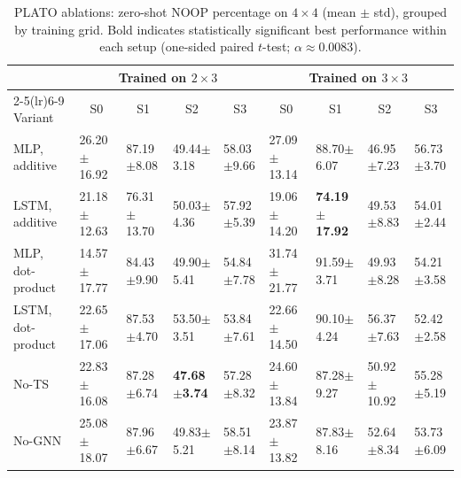 \begin{table}[h]
\centering
\small
\setlength{\tabcolsep}{1.4pt}
\renewcommand{\arraystretch}{1.02}
\begin{tabular}{@{\hspace{2pt}}l|l|l|l|l||l|l|l|l@{\hspace{2pt}}}
\toprule
& \multicolumn{4}{c||}{Trained on $2\times 3$} & \multicolumn{4}{c}{Trained on $3\times 3$} \\
\cmidrule(lr){2-5}\cmidrule(lr){6-9}
Variant & \multicolumn{1}{c|}{S0} & \multicolumn{1}{c|}{S1} & \multicolumn{1}{c|}{S2} & \multicolumn{1}{c||}{S3}
        & \multicolumn{1}{c|}{S0} & \multicolumn{1}{c|}{S1} & \multicolumn{1}{c|}{S2} & \multicolumn{1}{c}{S3} \\
\midrule
MLP, additive      & 26.20$\pm$16.92 & 87.19$\pm$8.08 & 49.44$\pm$3.18 & 58.03$\pm$9.66
                  & 27.09$\pm$13.14 & 88.70$\pm$6.07 & 46.95$\pm$7.23 & 56.73$\pm$3.70 \\
LSTM, additive     & 21.18$\pm$12.63 & 76.31$\pm$13.70 & 50.03$\pm$4.36 & 57.92$\pm$5.39
                  & 19.06$\pm$14.20 & \textbf{74.19$\pm$17.92} & 49.53$\pm$8.83 & 54.01$\pm$2.44 \\
MLP, dot-product   & 14.57$\pm$17.77 & 84.43$\pm$9.90 & 49.90$\pm$5.41 & 54.84$\pm$7.78
                  & 31.74$\pm$21.77 & 91.59$\pm$3.71 & 49.93$\pm$8.28 & 54.21$\pm$3.58 \\
LSTM, dot-product  & 22.65$\pm$17.06 & 87.53$\pm$4.70 & 53.50$\pm$3.51 & 53.84$\pm$7.61
                  & 22.66$\pm$14.50 & 90.10$\pm$4.24 & 56.37$\pm$7.63 & 52.42$\pm$2.58 \\
No-TS              & 22.83$\pm$16.08 & 87.28$\pm$6.74 & \textbf{47.68$\pm$3.74} & 57.28$\pm$8.32
                  & 24.60$\pm$13.84 & 87.28$\pm$9.27 & 50.92$\pm$10.92 & 55.28$\pm$5.19 \\
No-GNN             & 25.08$\pm$18.07 & 87.96$\pm$6.67 & 49.83$\pm$5.21 & 58.51$\pm$8.14
                  & 23.87$\pm$13.82 & 87.83$\pm$8.16 & 52.64$\pm$8.34 & 53.73$\pm$6.09 \\
\bottomrule
\end{tabular}
\caption{PLATO ablations: zero-shot NOOP percentage on $4\times 4$ (mean $\pm$ std), grouped by training grid. Bold indicates statistically significant best performance within each setup (one-sided paired $t$-test; $\alpha\approx0.0083$).}
\label{tab:ablate_4x4_noop_merged}
\end{table}

